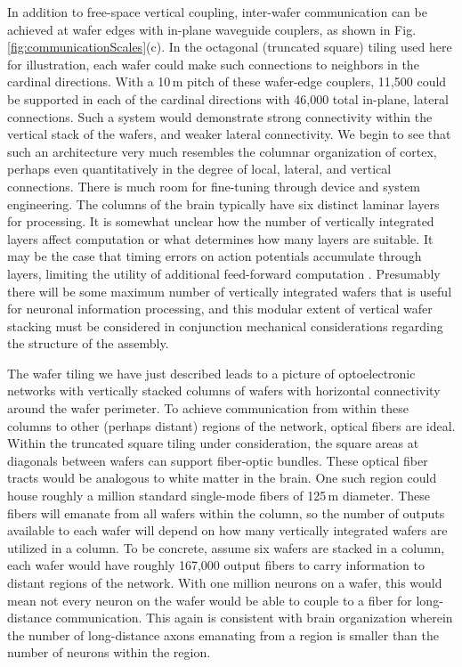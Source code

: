 \documentclass[twocolumn]{article}
\begin{document}
In addition to free-space vertical coupling, inter-wafer communication can be achieved at wafer edges with in-plane waveguide couplers, as shown in Fig.\,\ref{fig:communicationScales}(c). In the octagonal (truncated square) tiling used here for illustration, each wafer could make such connections to neighbors in the cardinal directions. With a 10\,\textmu m pitch of these wafer-edge couplers, 11,500 could be supported in each of the cardinal directions with 46,000 total in-plane, lateral connections. Such a system would demonstrate strong connectivity within the vertical stack of the wafers, and weaker lateral connectivity. We begin to see that such an architecture very much resembles the columnar organization of cortex, perhaps even quantitatively in the degree of local, lateral, and vertical connections. There is much room for fine-tuning through device and system engineering. The columns of the brain typically have six distinct laminar layers for processing. It is somewhat unclear how the number of vertically integrated layers affect computation or what determines how many layers are suitable. It may be the case that timing errors on action potentials accumulate through layers, limiting the utility of additional feed-forward computation \cite{}. Presumably there will be some maximum number of vertically integrated wafers that is useful for neuronal information processing, and this modular extent of vertical wafer stacking must be considered in conjunction mechanical considerations regarding the structure of the assembly. 

The wafer tiling we have just described leads to a picture of optoelectronic networks with vertically stacked columns of wafers with horizontal connectivity around the wafer perimeter. To achieve communication from within these columns to other (perhaps distant) regions of the network, optical fibers are ideal. Within the truncated square tiling under consideration, the square areas at diagonals between wafers can support fiber-optic bundles. These optical fiber tracts would be analogous to white matter in the brain. One such region could house roughly a million standard single-mode fibers of 125\,\textmu m diameter. These fibers will emanate from all wafers within the column, so the number of outputs available to each wafer will depend on how many vertically integrated wafers are utilized in a column. To be concrete, assume six wafers are stacked in a column, each wafer would have roughly 167,000 output fibers to carry information to distant regions of the network. With one million neurons on a wafer, this would mean not every neuron on the wafer would be able to couple to a fiber for long-distance communication. This again is consistent with brain organization wherein the number of long-distance axons emanating from a region is smaller than the number of neurons within the region. 
  
\end{document}
